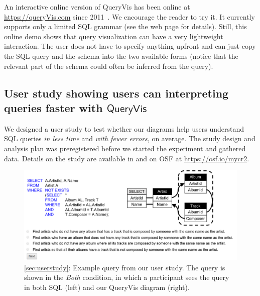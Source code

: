 \documentclass[letterpaper,11pt]{article}
\newcommand{\queryvis}{\textsf{QueryVis}\xspace}
\newcommand{\osfpreregplain}{osf.io/mycr2}
\newcommand{\osfprereg}{\url{https://\osfpreregplain}}
\begin{document}
An interactive online version of \queryvis has been online at \url{https://queryVis.com} since 2011~\cite{DanaparamitaG2011:QueryViz}.
We encourage the reader to try it. 
It currently supports only a limited SQL grammar (see the web page for details). 
Still, this online demo shows that query visualization can have a very lightweight interaction. 
The user does not have to specify anything upfront and can just copy the SQL query and the schema into the two available forms
(notice that the relevant part of the schema could often be inferred from the query). 





















\subsection{User study showing users can interpreting queries faster with $\queryvis$}
\label{sec:userstudy}



We designed a user study to test whether our diagrams help users understand SQL queries \emph{in less time} and \emph{with fewer errors}, on average.
The study design and analysis plan was preregistered before we started the experiment and gathered data.  
Details on the study are available 
in \cite{DBLP:conf/sigmod/LeventidisZDGJR20} 
and on OSF at \osfprereg.


\begin{figure}[t]
\centering
\includegraphics[scale=0.6]{figs/study_screenshot_v6.pdf} 
\caption{
	\autoref{sec:userstudy}: 
	Example query from our user study.
    The query is shown in the \emph{Both} condition, in which a participant sees the query in both SQL (left) and 
	our \queryvis diagram (right).
	}
\label{figure:study_screenshot}
\end{figure}
\end{document}
